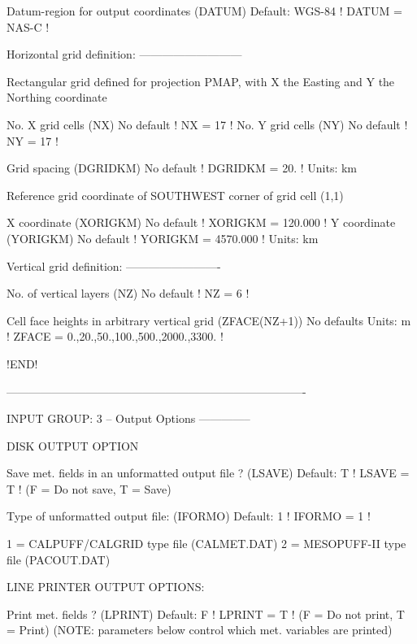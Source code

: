 \documentclass[a4paper,10pt]{article}
\begin{document}
     Datum-region for output coordinates
     (DATUM)                    Default: WGS-84    ! DATUM = NAS-C  !


     Horizontal grid definition:
     ---------------------------

     Rectangular grid defined for projection PMAP,
     with X the Easting and Y the Northing coordinate

            No. X grid cells (NX)      No default     ! NX =   17  !
            No. Y grid cells (NY)      No default     ! NY =   17  !

     Grid spacing (DGRIDKM)            No default     ! DGRIDKM = 20. !
                                       Units: km

     Reference grid coordinate of
     SOUTHWEST corner of grid cell (1,1)

        X coordinate (XORIGKM)         No default     ! XORIGKM = 120.000 !
        Y coordinate (YORIGKM)         No default     ! YORIGKM = 4570.000 !
                                       Units: km


     Vertical grid definition:
     -------------------------

        No. of vertical layers (NZ)    No default     ! NZ =  6  !

        Cell face heights in arbitrary
        vertical grid (ZFACE(NZ+1))    No defaults
                                       Units: m
        ! ZFACE = 0.,20.,50.,100.,500.,2000.,3300. !

!END!


-------------------------------------------------------------------------------

INPUT GROUP: 3 -- Output Options
--------------


    DISK OUTPUT OPTION

       Save met. fields in an unformatted
       output file ?              (LSAVE)  Default: T     ! LSAVE = T !
       (F = Do not save, T = Save)

       Type of unformatted output file:
       (IFORMO)                            Default: 1    ! IFORMO =  1  !

            1 = CALPUFF/CALGRID type file (CALMET.DAT)
            2 = MESOPUFF-II type file     (PACOUT.DAT)


    LINE PRINTER OUTPUT OPTIONS:

       Print met. fields ?  (LPRINT)       Default: F     ! LPRINT = T !
       (F = Do not print, T = Print)
       (NOTE: parameters below control which
              met. variables are printed)
\end{document}
